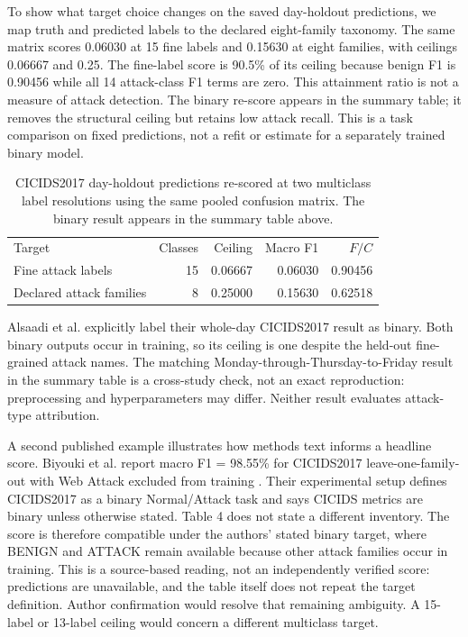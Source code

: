 \documentclass[namedate,webpdf,contemporary,large]{TBench-template}
\begin{document}
To show what target choice changes on the saved day-holdout predictions, we map truth and predicted labels to the declared eight-family taxonomy. The same matrix scores 0.06030 at 15 fine labels and 0.15630 at eight families, with ceilings 0.06667 and 0.25. The fine-label score is 90.5\% of its ceiling because benign F1 is 0.90456 while all 14 attack-class F1 terms are zero. This attainment ratio is not a measure of attack detection. The binary re-score appears in the summary table; it removes the structural ceiling but retains low attack recall. This is a task comparison on fixed predictions, not a refit or estimate for a separately trained binary model.

\begin{table}[h]\centering
\caption{CICIDS2017 day-holdout predictions re-scored at two multiclass label resolutions using the same pooled confusion matrix. The binary result appears in the summary table above.}
\begin{tabular}{lrrrr}
Target & Classes & Ceiling & Macro F1 & $F/C$ \\
Fine attack labels & 15 & 0.06667 & 0.06030 & 0.90456 \\
Declared attack families & 8 & 0.25000 & 0.15630 & 0.62518 \\
\end{tabular}\end{table}

Alsaadi et al. explicitly label their whole-day CICIDS2017 result as binary. Both binary outputs occur in training, so its ceiling is one despite the held-out fine-grained attack names. The matching Monday-through-Thursday-to-Friday result in the summary table is a cross-study check, not an exact reproduction: preprocessing and hyperparameters may differ. Neither result evaluates attack-type attribution.

A second published example illustrates how methods text informs a headline score. Biyouki et al. report macro F1 = 98.55\% for CICIDS2017 leave-one-family-out with Web Attack excluded from training \cite{biyouki2026}. Their experimental setup defines CICIDS2017 as a binary Normal/Attack task and says CICIDS metrics are binary unless otherwise stated. Table 4 does not state a different inventory. The score is therefore compatible under the authors' stated binary target, where BENIGN and ATTACK remain available because other attack families occur in training. This is a source-based reading, not an independently verified score: predictions are unavailable, and the table itself does not repeat the target definition. Author confirmation would resolve that remaining ambiguity. A 15-label or 13-label ceiling would concern a different multiclass target.
\end{document}
